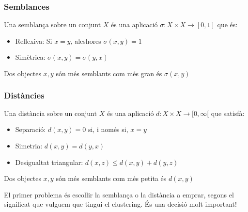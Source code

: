 \documentclass[12pt,t]{beamer}
\renewcommand{\emph}[1]{{\color{red}#1}}
\renewcommand{\leq}{\leqslant}
\theoremstyle{plain}
\theoremstyle{definition}
\begin{document}
\begin{frame}
\frametitle{Semblances}

Una \emph{semblança} sobre un conjunt $X$ és una aplicació $\sigma:X\times X\to [0,1]$ que és:
\begin{itemize}
\item \emph{Reflexiva}: Si $x=y$, aleshores $\sigma(x,y)=1$
\medskip

\item \emph{Simètrica}: $\sigma(x,y)=\sigma(y,x)$
\end{itemize}
\medskip

Dos objectes $x,y$ són més semblants com més gran és $\sigma(x,y)$
\end{frame}



\begin{frame}
\frametitle{Distàncies}

Una \emph{distància} sobre un conjunt $X$ és una aplicació $d:X\times X\to [0,\infty[$ que satisfà:
\begin{itemize}
\item \emph{Separació}: $d(x,y)=0$ si, i només si, $x=y$
\medskip

\item \emph{Simetria}: $d(x,y)=d(y,x)$
\medskip

\item \emph{Desigualtat triangular}: $d(x,z)\leq d(x,y)+d(y,z)$
\end{itemize}
\medskip

Dos objectes $x,y$ són més semblants com més petita és $d(x,y)$
\pause\bigskip


El primer problema és escollir la semblança o la distància a emprar, segons el significat que vulguem que tingui el clustering. \emph{És una decisió molt  important!}
\end{frame}
\end{document}
